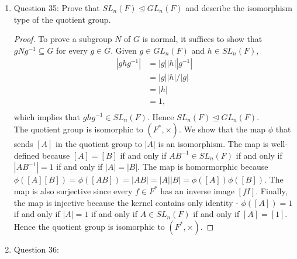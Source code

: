 \documentclass{article}
\begin{document}
\begin{enumerate}
\begin{enumerate}
\begin{enumerate}
\begin{proof}
              $\phi$ is surjective since every $sr^i\in D_{2k}$ has an
              inverse $sr^i$ in $D_{2n}$. It remains to show that $\phi$
              is injective. This is equivalent to showing that the kernel
              of $\phi$ contains only the identity $[1]$.
              In $D_{2k}$, two elements $r^{i_1}s^{j_1}$ and
              $r^{i_2}s^{j_2}$ are equal if and only if $i_1\equiv i_2
              \pmod{2}$ and $j_1\equiv j_2\pmod{k}$. Hence the inverse
              image of $\phi$ on $1=s^0r^0\in D_{2k}$ can only be of the
              form $[r^{4i}]$, where $i\in\mathbb{Z}$. Since
              $[r^{4i}]=[1]$, the kernel contains only the identity. So
              $\phi$ is an isomorphism, which completes our proof that the
              two groups are isomorphic.
            \end{proof}
        \end{enumerate}

      \item Question 35: Prove that $SL_n(F)\unlhd GL_n(F)$ and describe
        the isomorphism type of the quotient group.
        \begin{proof}
          To prove a subgroup $N$ of $G$ is normal, it suffices to show
          that $gNg^{-1}\subseteq G$ for every $g\in G$. Given $g\in
          GL_n(F)$ and $h\in SL_n(F)$,
          \begin{align*}
            |ghg^{-1}|  &= |g||h||g^{-1}| \\
                        &= |g||h|/|g|     \\
                        &= |h|            \\
                        &= 1,             \\
          \end{align*}
          which implies that $ghg^{-1}\in SL_n(F)$. Hence $SL_n(F)\unlhd
          GL_n(F)$. \\

          The quotient group is isomorphic to $(F^*,\times)$. We show that
          the map $\phi$ that sends $[A]$ in the quotient group to $|A|$ is
          an isomorphism. The map is well-defined because $[A]=[B]$ if and
          only if $AB^{-1}\in SL_n(F)$ if and only if $|AB^{-1}|=1$ if and
          only if $|A|=|B|$. The map is homormorphic because
          $\phi([A][B])=\phi([AB])=|AB|=|A||B|=\phi([A])\phi([B])$. The map
          is also surjective since every $f\in F^*$ has an inverse image
          $[fI]$. Finally, the map is injective because the kernel contains
          only identity - $\phi([A])=1$ if and only if $|A|=1$ if and only
          if $A\in SL_n(F)$ if and only if $[A]=[1]$. Hence the quotient
          group is isomorphic to $(F^*,\times)$.
        \end{proof}

      \item Question 36:
    \end{enumerate}
\end{enumerate}
\end{document}
